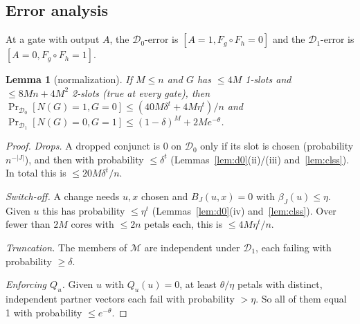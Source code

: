 \documentclass[11pt,a4paper]{article}
\theoremstyle{plain}
\newtheorem{lemma}[theorem]{Lemma}
\theoremstyle{definition}
\theoremstyle{remark}
\newcommand{\Dz}{\mathcal{D}_0}
\newcommand{\Do}{\mathcal{D}_1}
\begin{document}
\subsection{Error analysis}
At a gate with output $A$, the $\Dz$-error is $[A=1,F_g\circ F_h=0]$ and the $\Do$-error is
$[A=0,F_g\circ F_h=1]$.

\begin{lemma}[normalization]\label{lem:norm}
If $M\le n$ and $G$ has $\le4M$ 1-slots and $\le8Mn+4M^2$ 2-slots (true at every gate), then
$\Pr_{\Dz}[N(G)=1,G=0]\le(40M\delta^t+4M\eta^t)/n$ and $\Pr_{\Do}[N(G)=0,G=1]\le(1-\delta)^M+2Me^{-\theta}$.
\end{lemma}
\begin{proof}
\emph{Drops.} A dropped conjunct is 0 on $\Dz$ only if its slot is chosen (probability $n^{-|J|}$), and then with
probability $\le\delta^t$ (Lemmas~\ref{lem:d0}(ii)/(iii) and~\ref{lem:clss}). In total this is $\le20M\delta^t/n$.

\emph{Switch-off.} A change needs $u,x$ chosen and $B_J(u,x)=0$ with $\beta_J(u)\le\eta$. Given $u$ this has
probability $\le\eta^t$ (Lemmas~\ref{lem:d0}(iv) and~\ref{lem:clss}). Over fewer than $2M$ cores with $\le2n$ petals
each, this is $\le4M\eta^t/n$.

\emph{Truncation.} The members of $\mathcal M$ are independent under $\Do$, each failing with probability
$\ge\delta$.

\emph{Enforcing $Q_u$.} Given $u$ with $Q_u(u)=0$, at least $\theta/\eta$ petals with distinct, independent partner
vectors each fail with probability $>\eta$. So all of them equal 1 with probability $\le e^{-\theta}$.
\end{proof}
\end{document}
